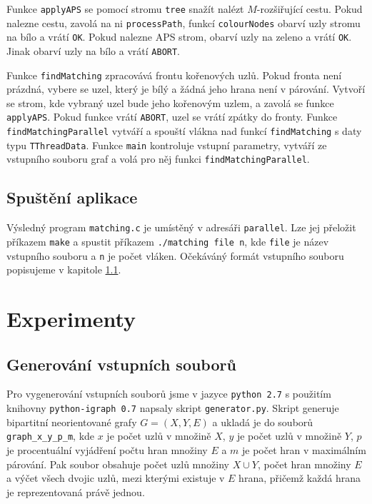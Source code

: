 \documentclass[a4paper, 11pt, titlepage, final]{article}[3. prosinec 2011]
\begin{document}
Funkce \texttt{applyAPS} se pomocí stromu \texttt{tree} snažít nalézt $M$-rozšiřující cestu. Pokud nalezne cestu, zavolá na ni \texttt{processPath}, funkcí \texttt{colourNodes} obarví uzly stromu na bílo a vrátí \texttt{OK}. Pokud nalezne APS strom, obarví uzly na zeleno a vrátí \texttt{OK}. Jinak obarví uzly na bílo a vrátí \texttt{ABORT}.

Funkce \texttt{findMatching} zpracovává frontu kořenových uzlů. Pokud fronta není prázdná, vybere se uzel, který je bílý a žádná jeho hrana není v párování. Vytvoří se strom, kde vybraný uzel bude jeho kořenovým uzlem, a zavolá se funkce \texttt{applyAPS}. Pokud funkce vrátí \texttt{ABORT}, uzel se vrátí zpátky do fronty. Funkce \texttt{findMatchingParallel} vytváří a spouští vlákna nad funkcí \texttt{findMatching} s daty typu \texttt{TThreadData}. Funkce \texttt{main} kontroluje vstupní parametry, vytváří ze vstupního souboru graf a volá pro něj funkci \texttt{findMatchingParallel}.

\subsection{Spuštění aplikace}

Výsledný program \texttt{matching.c} je umístěný v adresáři \texttt{parallel}. Lze jej přeložit příkazem \texttt{make} a spustit příkazem \texttt{./matching file n}, kde \texttt{file} je název vstupního souboru a \texttt{n} je počet vláken. Očekáváný formát vstupního souboru popisujeme v kapitole \ref{secGenerating}.

\section{Experimenty}

\subsection{Generování vstupních souborů} \label{secGenerating}

Pro vygenerování vstupních souborů jsme v jazyce \texttt{python 2.7} s použitím knihovny \texttt{python-igraph 0.7} napsaly skript \texttt{generator.py}. 
Skript generuje bipartitní neorientované grafy $G=(X,Y,E)$ a ukladá je do souborů \texttt{graph\_x\_y\_p\_m}, kde $x$ je počet uzlů v množině $X$, $y$ je počet uzlů v množině $Y$, $p$ je procentuální vyjádření počtu hran množiny $E$ a $m$ je počet hran v maximálním párování. Pak soubor obsahuje počet uzlů množiny $X \cup Y$, počet hran množiny $E$ a výčet všech dvojic uzlů, mezi kterými existuje v $E$ hrana, přičemž každá hrana je reprezentovaná právě jednou.
\end{document}
